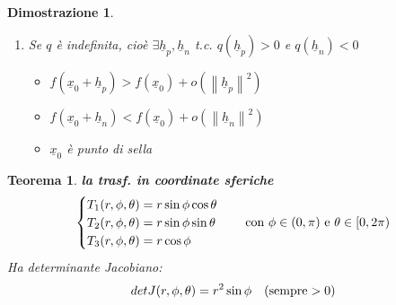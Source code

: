\documentclass[10pt,landscape, a4paper]{article}
\newtheorem{teorema}{Teorema}
\newenvironment{thm}{\begin{mdframed}[backgroundcolor=white]\begin{teorema}}{\end{teorema}\end{mdframed}}
\newtheorem{demnstrn}{Dimostrazione}
\newenvironment{dimostrazione}{\begin{mdframed}[backgroundcolor=white]\begin{demnstrn}}{\end{demnstrn}\end{mdframed}}
\begin{document}
\begin{multicols}{3}
\begin{dimostrazione}
\begin{enumerate}
			\begin{itemize}
				\item $f(\underline{x}_0 + \underline{h}) < f(\underline{x}_0) + o(\left\lVert \underline{h} \right\rVert^2)$
			\end{itemize}
		\item[$iii)$] Se $q$ è indefinita, cioè $\exists \underline{h}_p, \underline{h}_n$ t.c. $q(\underline{h}_p)>0$ e $q(\underline{h}_n)<0$
			\begin{itemize}
				\item $f(\underline{x}_0 + \underline{h}_p) > f(\underline{x}_0) + o(\left\lVert \underline{h}_p \right\rVert^2)$
				\item $f(\underline{x}_0 + \underline{h}_n) < f(\underline{x}_0) + o(\left\lVert \underline{h}_n \right\rVert^2)$
				\item $\underline{x}_0$ è punto di sella
			\end{itemize}
	\end{enumerate}

\end{dimostrazione}




\begin{thm} \textbf{la trasf. in coordinate sferiche}\\
\begin{equation}
	\begin{cases}
		T_1(r, \phi, \theta) = r \sin\phi\cos\theta\\
		T_2(r, \phi, \theta) = r \sin\phi\sin\theta\\
		T_3(r, \phi, \theta) = r \cos\phi
	\end{cases} \quad \textnormal{con } \phi \in (0,\pi) \textnormal{ e } \theta \in [0,2\pi)
	\end{equation}
	Ha determinante Jacobiano:
	\begin{equation}
		det J(r, \phi, \theta) = r^2 \sin\phi \quad (\textnormal{sempre} > 0)
	\end{equation}


\end{thm}
\end{multicols}
\end{document}
